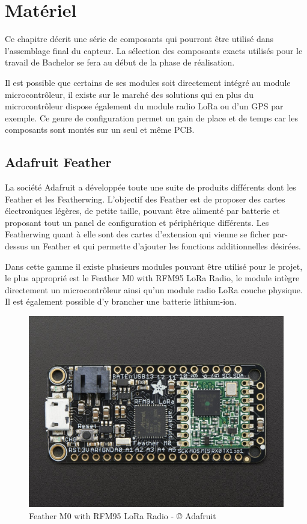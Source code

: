 \section{Matériel}

Ce chapitre décrit une série de composants qui pourront être utilisé dans l’assemblage final du capteur. La sélection des composants exacts utilisés pour le travail de Bachelor se fera au début de la phase de réalisation.

Il est possible que certains de ses modules soit directement intégré au module microcontrôleur, il existe sur le marché des solutions qui en plus du microcontrôleur dispose également du module radio LoRa ou d’un GPS par exemple. Ce genre de configuration permet un gain de place et de temps car les composants sont montés sur un seul et même PCB.

\subsection{Adafruit Feather}

La société Adafruit a développée toute une suite de produits différents dont les Feather et les Featherwing. L’objectif des Feather est de proposer des cartes électroniques légères, de petite taille, pouvant être alimenté par batterie et proposant tout un panel de configuration et périphérique différents. Les Featherwing quant à elle sont des cartes d’extension qui vienne se ficher par-dessus un Feather et qui permette d’ajouter les fonctions additionnelles désirées.

Dans cette gamme il existe plusieurs modules pouvant être utilisé pour le projet, le plus approprié est le Feather M0 with RFM95 LoRa Radio, le module intègre directement un microcontrôleur ainsi qu’un module radio LoRa couche physique. Il est également possible d’y brancher une batterie lithium-ion.

\begin{figure}[htb]
\centering 
\includegraphics[width=0.4\columnwidth]{../images/adafruit-feather-m0-lora.jpg} 
\caption[Adafruit Feather]{Feather M0 with RFM95 LoRa Radio - © Adafruit}
\label{fig:ada_feather}
\end{figure}

